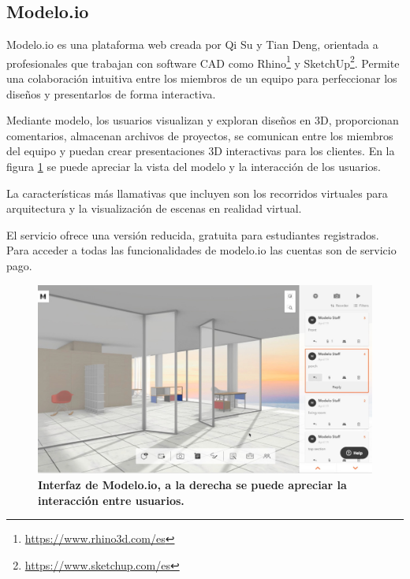 \subsection{Modelo.io}

Modelo.io\citep{Modelo.io2018} es una plataforma web creada por Qi Su y Tian Deng, orientada a profesionales que trabajan con software CAD como Rhino\footnote{\url{https://www.rhino3d.com/es}} y SketchUp\footnote{\url{https://www.sketchup.com/es}}. Permite una colaboración intuitiva entre los miembros de un equipo para perfeccionar los diseños y presentarlos de forma interactiva.

Mediante modelo, los usuarios visualizan y exploran diseños en 3D, proporcionan comentarios, almacenan archivos de proyectos, se comunican entre los miembros del equipo y puedan crear presentaciones 3D interactivas para los clientes. En la figura \ref{fig:modelo.io} se puede apreciar la vista del modelo y la interacción de los usuarios.

La características más llamativas que incluyen son los recorridos virtuales para arquitectura y la visualización de escenas en realidad virtual.

El servicio ofrece una versión reducida, gratuita para estudiantes registrados. Para acceder a todas las funcionalidades de modelo.io las cuentas son de servicio pago.

\begin{figure}[h]
\includegraphics[width=14cm]{Img/WEB/web-modelo.jpg}
\centering
\caption{\textbf{ \footnotesize{Interfaz de Modelo.io, a la derecha se puede apreciar la interacción entre usuarios.}}}
\label{fig:modelo.io}
\end{figure}